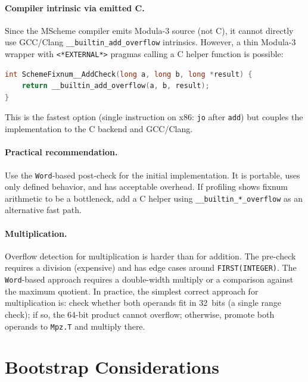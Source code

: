 \documentclass[12pt]{report}
\begin{document}
\paragraph{Compiler intrinsic via emitted C.}
Since the MScheme compiler emits Modula-3 source (not C), it cannot
directly use GCC/Clang {\tt \_\_builtin\_add\_overflow} intrinsics.
However, a thin Modula-3 wrapper with {\tt <*EXTERNAL*>} pragmas
calling a C helper function is possible:

\begin{lstlisting}[language=C]
int SchemeFixnum__AddCheck(long a, long b, long *result) {
    return __builtin_add_overflow(a, b, result);
}
\end{lstlisting}

\noindent This is the fastest option (single instruction on x86:
{\tt jo} after {\tt add}) but couples the implementation to the
C backend and GCC/Clang.

\paragraph{Practical recommendation.}
Use the {\tt Word}-based post-check for the initial implementation.
It is portable, uses only defined behavior, and has acceptable
overhead.  If profiling shows fixnum arithmetic to be a bottleneck,
add a C helper using {\tt \_\_builtin\_*\_overflow} as an alternative
fast path.

\paragraph{Multiplication.}
Overflow detection for multiplication is harder than for addition.
The pre-check requires a division (expensive) and has edge cases
around {\tt FIRST(INTEGER)}.  The {\tt Word}-based approach requires
a double-width multiply or a comparison against the maximum quotient.
In practice, the simplest correct approach for multiplication is:
check whether both operands fit in 32~bits (a single range check);
if so, the 64-bit product cannot overflow; otherwise, promote both
operands to {\tt Mpz.T} and multiply there.

\section{Bootstrap Considerations}
\end{document}
